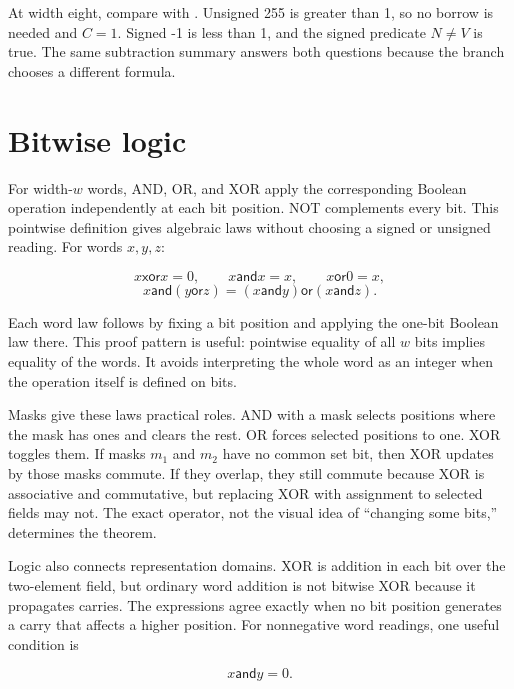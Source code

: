 \begin{example}[title={One subtraction, two orders}]
At width eight, compare  with . Unsigned 255 is greater
than 1, so no borrow is needed and \(C=1\). Signed -1 is less than 1, and the
signed predicate \(N\ne V\) is true. The same subtraction summary answers
both questions because the branch chooses a different formula.
\end{example}

\section{Bitwise logic}

For width-\(w\) words, AND, OR, and XOR apply the corresponding Boolean
operation independently at each bit position. NOT complements every bit. This
pointwise definition gives algebraic laws without choosing a signed or
unsigned reading. For words \(x,y,z\):

\[
  x\mathbin{\mathsf{xor}}x=0,
  \qquad
  x\mathbin{\mathsf{and}}x=x,
  \qquad
  x\mathbin{\mathsf{or}}0=x,
\]
\[
  x\mathbin{\mathsf{and}}(y\mathbin{\mathsf{or}}z)
  =
  (x\mathbin{\mathsf{and}}y)\mathbin{\mathsf{or}}
  (x\mathbin{\mathsf{and}}z).
\]

Each word law follows by fixing a bit position and applying the one-bit Boolean
law there. This proof pattern is useful: pointwise equality of all \(w\) bits
implies equality of the words. It avoids interpreting the whole word as an
integer when the operation itself is defined on bits.

Masks give these laws practical roles. AND with a mask selects positions where
the mask has ones and clears the rest. OR forces selected positions to one.
XOR toggles them. If masks \(m_1\) and \(m_2\) have no common set bit, then
XOR updates by those masks commute. If they overlap, they still commute because
XOR is associative and commutative, but replacing XOR with assignment to
selected fields may not. The exact operator, not the visual idea of ``changing
some bits,'' determines the theorem.

Logic also connects representation domains. XOR is addition in each bit over
the two-element field, but ordinary word addition is not bitwise XOR because
it propagates carries. The expressions agree exactly when no bit position
generates a carry that affects a higher position. For nonnegative word
readings, one useful condition is

\[
  x\mathbin{\mathsf{and}}y=0.
\]

